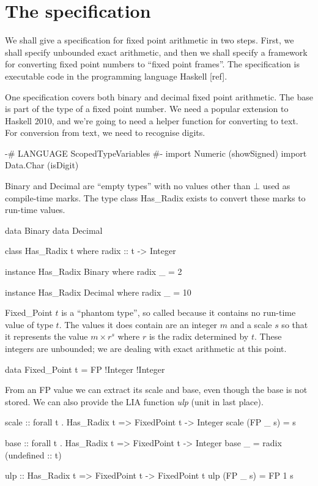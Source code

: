 \documentclass{article}
\begin{document}
\section{The specification}

We shall give a specification for fixed point arithmetic in two
steps.  First, we shall specify unbounded exact arithmetic, and
then we shall specify a framework for converting fixed point
numbers to ``fixed point frames''.  The specification is executable
code in the programming language Haskell [ref].

One specification covers both binary and decimal fixed point
arithmetic.  The base is part of the type of a fixed point number.
We need a popular extension to Haskell 2010, and we're going to
need a helper function for converting to text.  For conversion
from text, we need to recognise digits.
\begin{code}
{-# LANGUAGE ScopedTypeVariables #-}
import Numeric (showSigned)
import Data.Char (isDigit)
\end{code}
Binary and Decimal are ``empty types'' with no values other
than $\bot$ used as compile-time marks.  The type class
Has\_Radix exists to convert these marks to run-time values.
\begin{code}
data Binary
data Decimal

class Has_Radix t
  where radix :: t -> Integer

instance Has_Radix Binary
  where radix _ = 2

instance Has_Radix Decimal
  where radix _ = 10
\end{code}

Fixed\_Point $t$ is a ``phantom type'', so called because it
contains no run-time value of type $t$.  The values it does
contain are an integer $m$ and a scale $s$ so that it represents
the value $m\times r^s$ where $r$ is the radix determined by $t$.
These integers are unbounded; we are dealing with exact arithmetic
at this point.
\begin{code}
data Fixed_Point t = FP !Integer !Integer
\end{code}

From an FP value we can extract its scale and base, even though
the base is not stored.  We can also provide the LIA function
{\it ulp} (unit in last place).

\begin{code}
scale :: forall t . Has_Radix t => FixedPoint t -> Integer
scale (FP _ s) = s

base :: forall t . Has_Radix t => FixedPoint t -> Integer
base _ = radix (undefined :: t)

ulp :: Has_Radix t => FixedPoint t -> FixedPoint t
ulp (FP _ s) = FP 1 s
\end{code}
\end{document}
